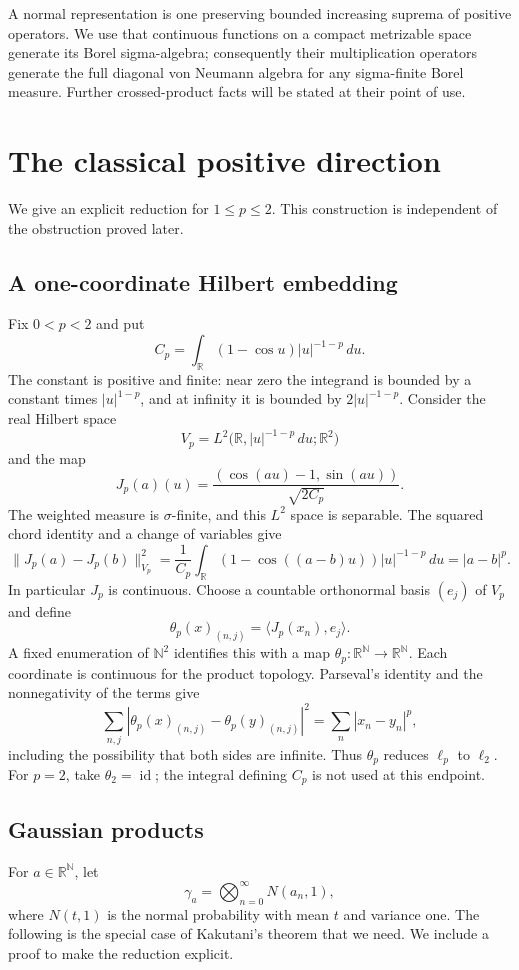 \documentclass[11pt]{article}
\theoremstyle{definition}
\newcommand{\N}{\mathbb N}
\newcommand{\R}{\mathbb R}
\newcommand{\id}{\operatorname{id}}
\begin{document}
A normal representation is one preserving bounded increasing suprema
of positive operators. We use that continuous functions on a compact
metrizable space generate its Borel sigma-algebra; consequently their
multiplication operators generate the full diagonal von Neumann algebra
for any sigma-finite Borel measure. Further crossed-product facts will
be stated at their point of use.

\section{The classical positive direction}
We give an explicit reduction for $1\le p\le2$. This construction is
independent of the obstruction proved later.

\subsection{A one-coordinate Hilbert embedding}
Fix $0<p<2$ and put
\[
 C_p=\int_{\R}(1-\cos u)|u|^{-1-p}\,du.
\]
The constant is positive and finite: near zero the integrand is bounded
by a constant times $|u|^{1-p}$, and at infinity it is bounded by
$2|u|^{-1-p}$. Consider the real Hilbert space
\[
 V_p=L^2\bigl(\R,|u|^{-1-p}\,du;\R^2\bigr)
\]
and the map
\[
 J_p(a)(u)=\frac{(\cos(au)-1,\sin(au))}{\sqrt{2C_p}}.
\]
The weighted measure is $\sigma$-finite, and this $L^2$ space is
separable. The squared chord identity and a change of variables give
\begin{equation}\label{eq:snowflake}
 \|J_p(a)-J_p(b)\|_{V_p}^2
 =\frac1{C_p}\int_\R(1-\cos((a-b)u))|u|^{-1-p}\,du
 =|a-b|^p.
\end{equation}
In particular $J_p$ is continuous. Choose a countable orthonormal basis
$(e_j)$ of $V_p$ and define
\[
 \theta_p(x)_{(n,j)}=\langle J_p(x_n),e_j\rangle.
\]
A fixed enumeration of $\N^2$ identifies this with a map
$\theta_p:\R^\N\to\R^\N$. Each coordinate is continuous for the
product topology. Parseval's identity and the nonnegativity of the terms
give
\begin{equation}\label{eq:theta}
 \sum_{n,j}|\theta_p(x)_{(n,j)}-\theta_p(y)_{(n,j)}|^2
 =\sum_n|x_n-y_n|^p,
\end{equation}
including the possibility that both sides are infinite. Thus
$\theta_p$ reduces $\ell_p$ to $\ell_2$. For $p=2$, take $\theta_2=\id$;
the integral defining $C_p$ is not used at this endpoint.

\subsection{Gaussian products}
For $a\in\R^\N$, let
\[
 \gamma_a=\bigotimes_{n=0}^{\infty}N(a_n,1),
\]
where $N(t,1)$ is the normal probability with mean $t$ and variance one.
The following is the special case of Kakutani's theorem that we need.
We include a proof to make the reduction explicit.
\end{document}
